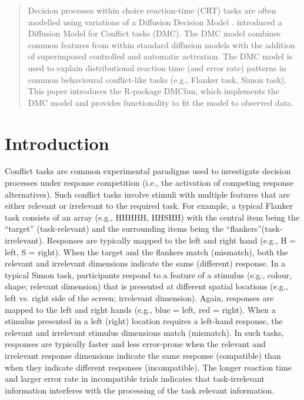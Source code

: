 \begin{abstract}

    Decision processes within choice reaction-time (CRT) tasks are often
    modelled using variations of a Diffusion Decision Model \parencite[DDM, for
    a review, see][] {ratcliff2008diffusion}. \textcite{ulrich2015automatic}
    introduced a Diffusion Model for Conflict tasks (DMC). The DMC model
    combines common features from within standard diffusion models with the
    addition of superimposed controlled and automatic activation. The DMC model
    is used to explain distributional reaction time (and error rate) patterns
    in common behavioural conflict-like tasks (e.g., Flanker task, Simon task).
    This paper introduces the R-package DMCfun, which implements the DMC model
    and provides functionality to fit the model to observed data.


\end{abstract}

\section{Introduction}
\label{introduction}

Conflict tasks \parencite[e.g., Flanker task, Simon task, Stroop task,
see][, respectively]{eriksen1974effects, lu1995influence, macleod1991half} are
common experimental paradigms used to investigate decision processes under
response competition (i.e., the activation of competing response alternatives).
Such conflict tasks involve stimuli with multiple features that are either
relevant or irrelevant to the required task. For example, a typical Flanker
task consists of an array (e.g., HHHHH, HHSHH) with the central item being the
``target'' (task-relevant) and the surrounding items being the
``flankers''(task-irrelevant). Responses are typically mapped to the left and
right hand (e.g., H = left, S = right). When the target and the flankers match
(mismatch), both the relevant and irrelevant dimensions indicate the same
(different) response. In a typical Simon task, participants respond to a
feature of a stimulus (e.g., colour, shape; relevant dimension) that is
presented at different spatial locations (e.g., left vs. right side of the
screen; irrelevant dimension). Again, responses are mapped to the left and
right hands (e.g., blue = left, red = right). When a stimulus presented in a
left (right) location requires a left-hand response, the relevant and
irrelevant stimulus dimensions match (mismatch). In such tasks, responses are
typically faster and less error-prone when the relevant and irrelevant response
dimensions indicate the same response (compatible) than when they indicate
different responses (incompatible). The longer reaction time and larger error
rate in incompatible trials indicates that task-irrelevant information
interferes with the processing of the task relevant information.
    
